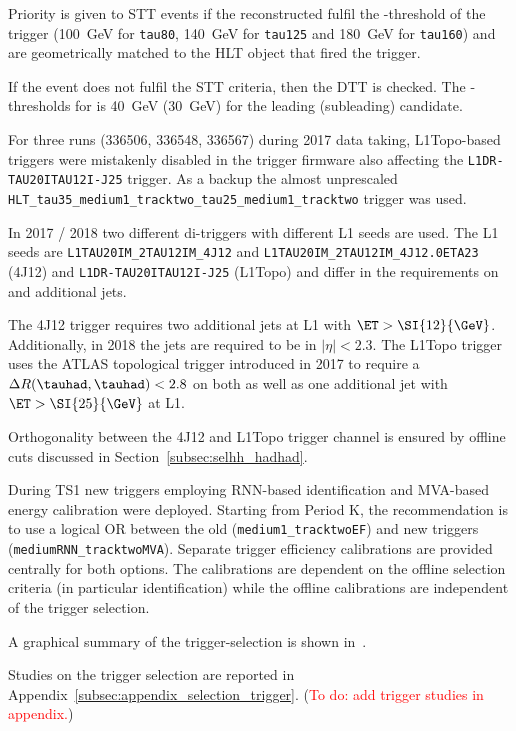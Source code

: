 Priority is given to STT events if the reconstructed \tauhad fulfil the
\pT-threshold of the trigger (\SI{100}{\GeV} for \verb|tau80|, \SI{140}{\GeV}
for \verb|tau125| and \SI{180}{\GeV} for \verb|tau160|) and are geometrically
matched to the HLT object that fired the trigger.

If the event does not fulfil the STT criteria, then the DTT is checked. The
\pT-thresholds for \tauhad is \SI{40}{\GeV} (\SI{30}{\GeV}) for the leading
(subleading) \tauhad candidate.

For three runs (336506, 336548, 336567) during 2017 data taking, L1Topo-based
triggers were mistakenly disabled in the trigger firmware also affecting the
\verb|L1DR-TAU20ITAU12I-J25| trigger. As a backup the almost unprescaled
\verb|HLT_tau35_medium1_tracktwo_tau25_medium1_tracktwo| trigger was used.

In 2017 / 2018 two different di-\tauhad triggers with different L1 seeds are
used. The L1 seeds are \verb|L1TAU20IM_2TAU12IM_4J12| and
\verb|L1TAU20IM_2TAU12IM_4J12.0ETA23| (4J12) and \verb|L1DR-TAU20ITAU12I-J25|
(L1Topo) and differ in the requirements on \tauhad and additional jets.

The 4J12 trigger requires two additional jets at L1 with $\ET > \SI{12}{\GeV}$.
Additionally, in 2018 the jets are required to be in $|\eta| < 2.3$. The L1Topo
trigger uses the ATLAS topological trigger introduced in 2017 to require a
$\Delta R(\tauhad, \tauhad) < 2.8$ on both \tauhad as well as one additional jet
with $\ET > \SI{25}{\GeV}$ at L1.

Orthogonality between the 4J12 and L1Topo trigger channel is ensured by offline
cuts discussed in Section~\ref{subsec:selhh_hadhad}.

During TS1 new \tauhad triggers employing RNN-based \tauhad
identification and MVA-based energy calibration were
deployed. Starting from Period K, the recommendation is to use a
logical OR between the old (\verb|medium1_tracktwoEF|) and new
triggers (\verb|mediumRNN_tracktwoMVA|). Separate trigger efficiency
calibrations are provided centrally for both options. The calibrations
are dependent on the offline \tauhad selection criteria (in particular
\tauhad identification) while the offline \tauhad calibrations are
independent of the trigger selection.

A graphical summary of the trigger-selection is shown
in~.

Studies on the trigger selection are reported in Appendix~\ref{subsec:appendix_selection_trigger}. (\textcolor{red}{To do: add trigger studies in appendix.})

